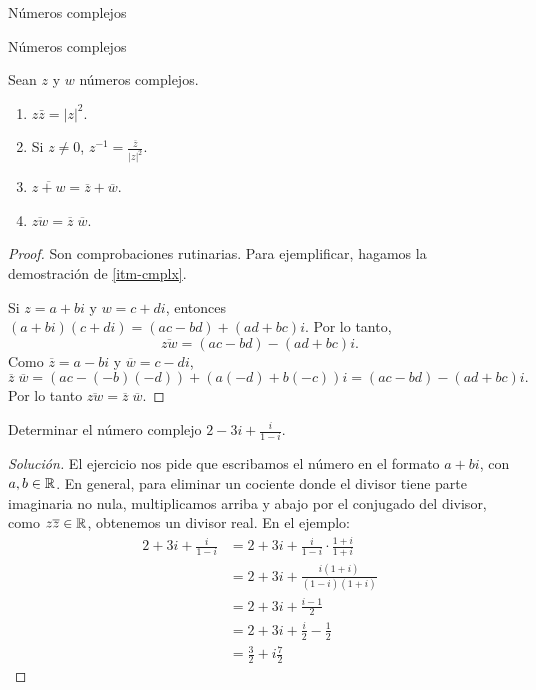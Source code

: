 \begin{chapter}{N\'umeros complejos}
\begin{section}{N\'umeros complejos}
    \begin{proposicion} Sean $z$ y $w$ números complejos.
        \begin{enumerate}
            \item $z\bar{z} = |z|^2$.
            \item Si $z \ne 0$, $z^{-1} = \displaystyle\frac{\overline{z}}{|z|^2}$.
            \item  $\overline{z+w} = \overline{z} + \overline{w}$.
            \item\label{itm-cmplx}  $\overline{zw} = \overline{z}\;  \overline{w}$.
        \end{enumerate}
    \end{proposicion}
    \begin{proof}
        Son comprobaciones rutinarias. Para ejemplificar, hagamos la demostración  de \ref{itm-cmplx}.

        Si $z = a + bi$ y $w = c +di$, entonces $(a+bi) (c+di) = (ac -bd) + (ad+bc)i$. Por lo tanto,
        \begin{equation*}
            \overline{zw} = (ac -bd) - (ad+bc)i.
        \end{equation*}
        Como $\overline{z} = a - bi$ y $\overline{w} = c -di$,
        \begin{equation*}
            \overline{z}\;  \overline{w} = (ac -(-b)(-d)) + (a(-d)+b(-c) )i = (ac -bd) - (ad+bc)i.
        \end{equation*}
        Por lo tanto $	\overline{zw} = \overline{z}\;  \overline{w}$.
    \end{proof}

    \begin{ejercicio*}
        Determinar el número complejo $2- 3i + \displaystyle\frac{i}{1-i}$.
    \end{ejercicio*}
    \begin{proof}[Solución]
        El  ejercicio nos pide que escribamos el número en el formato $a + bi$, con $a,b \in \mathbb R$. En general, para eliminar un cociente donde el divisor tiene parte imaginaria no nula, multiplicamos arriba y abajo por el conjugado del divisor, como $z\overline{z} \in \mathbb R$, obtenemos un divisor real. En  el ejemplo:
        \begin{align*}
            2+ 3i + \frac{i}{1-i} & = 2+3i +\frac{i}{1-i}\cdot\frac{1+i}{1+i} \\
                & = 2+3i +\frac{i(1+i)}{(1-i)(1+i)}         \\
                & =  2+3i +\frac{i-1}{2}                    \\
                & = 2+3i +\frac{i}{2}-\frac{1}{2}           \\
                & =\frac{3}{2}+i\frac{7}{2}
        \end{align*}
    \end{proof}



\end{section}
\end{chapter}
